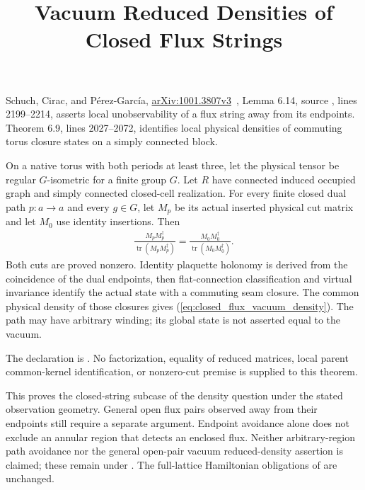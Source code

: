 \documentclass{article}
\title{Vacuum Reduced Densities of Closed Flux Strings}
\author{}
\date{}
\begin{document}
\maketitle
{}

Schuch, Cirac, and P\'erez-Garc\'ia,
\href{https://arxiv.org/abs/1001.3807v3}{arXiv:1001.3807v3}~\cite{Schuch2010PEPS},
Lemma 6.14, source , lines 2199--2214,
asserts local unobservability of a flux string away from its endpoints.
Theorem 6.9, lines 2027--2072, identifies local physical densities of
commuting torus closure states on a simply connected block.

On a native torus with both periods at least three, let the physical tensor
be regular $G$-isometric for a finite group $G$. Let $R$ have connected
induced occupied graph and simply connected closed-cell realization.
For every finite closed dual path $p:a\to a$ and every $g\in G$, let $M_p$
be its actual inserted physical cut matrix and let $M_0$ use identity
insertions. Then
\begin{align}
    \frac{M_pM_p^\dagger}{\operatorname{tr}(M_pM_p^\dagger)}
    =\frac{M_0M_0^\dagger}{\operatorname{tr}(M_0M_0^\dagger)}.
    \label{eq:closed_flux_vacuum_density}
\end{align}
Both cuts are proved nonzero. Identity plaquette holonomy is derived from
the coincidence of the dual endpoints, then flat-connection classification
and virtual invariance identify the actual state with a commuting seam
closure. The common physical density of those closures gives
(\ref{eq:closed_flux_vacuum_density}). The path may have arbitrary winding;
its global state is not asserted equal to the vacuum.

The declaration is
.
No factorization, equality of reduced matrices, local parent common-kernel
identification, or nonzero-cut premise is supplied to this theorem.

This proves the closed-string subcase of the density question under the
stated observation geometry. General open flux pairs observed away from
their endpoints still require a separate argument. Endpoint avoidance
alone does not exclude an annular region that detects an enclosed flux.
Neither arbitrary-region path avoidance nor the general open-pair vacuum
reduced-density assertion is claimed; these remain under .
The full-lattice Hamiltonian obligations of  are unchanged.
\end{document}
